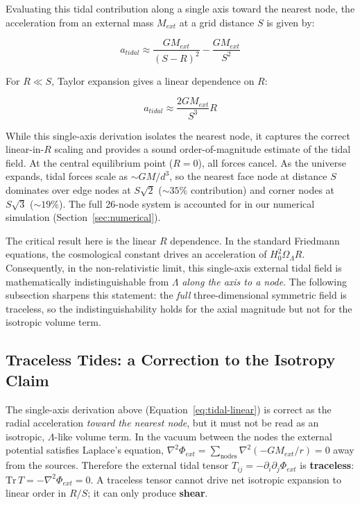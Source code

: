 \documentclass{article}
\begin{document}
Evaluating this tidal contribution along a single axis toward the nearest node, the acceleration from an external mass $M_{ext}$ at a grid distance $S$ is given by:

\begin{equation}
a_{tidal} \approx \frac{G M_{ext}}{(S - R)^2} - \frac{G M_{ext}}{S^2}
\label{eq:tidal-exact}
\end{equation}

For $R \ll S$, Taylor expansion gives a linear dependence on $R$:

\begin{equation}
a_{tidal} \approx \frac{2 G M_{ext}}{S^3} R
\label{eq:tidal-linear}
\end{equation}

While this single-axis derivation isolates the nearest node, it captures the correct linear-in-$R$ scaling and provides a sound order-of-magnitude estimate of the tidal field. At the central equilibrium point ($R = 0$), all forces cancel. As the universe expands, tidal forces scale as $\sim G M / d^3$, so the nearest face node at distance $S$ dominates over edge nodes at $S\sqrt{2}$ ($\sim 35\%$ contribution) and corner nodes at $S\sqrt{3}$ ($\sim 19\%$). The full 26-node system is accounted for in our numerical simulation (Section~\ref{sec:numerical}).

The critical result here is the linear $R$ dependence. In the standard Friedmann equations, the cosmological constant drives an acceleration of $H_0^2 \Omega_\Lambda R$. Consequently, in the non-relativistic limit, this single-axis external tidal field is mathematically indistinguishable from $\Lambda$ \emph{along the axis to a node}. The following subsection sharpens this statement: the \emph{full} three-dimensional symmetric field is traceless, so the indistinguishability holds for the axial magnitude but not for the isotropic volume term.

\subsection{Traceless Tides: a Correction to the Isotropy Claim}
\label{sec:traceless}
The single-axis derivation above (Equation~\ref{eq:tidal-linear}) is correct as the radial acceleration \emph{toward the nearest node}, but it must not be read as an isotropic, $\Lambda$-like volume term. In the vacuum between the nodes the external potential satisfies Laplace's equation, $\nabla^2 \Phi_{ext} = \sum_{\text{nodes}} \nabla^2(-GM_{ext}/r) = 0$ away from the sources. Therefore the external tidal tensor $T_{ij} = -\partial_i \partial_j \Phi_{ext}$ is \textbf{traceless}: $\mathrm{Tr}\,T = -\nabla^2 \Phi_{ext} = 0$. A traceless tensor cannot drive net isotropic expansion to linear order in $R/S$; it can only produce \textbf{shear}.
\end{document}
